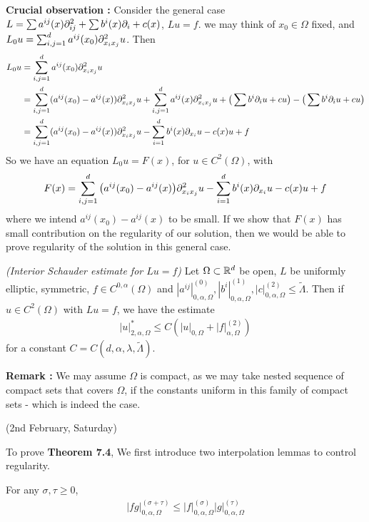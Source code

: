 \documentclass[12pt,a4paper]{article}
\begin{document}
\textbf{Crucial observation :} Consider the general case $L =\sum a^{ij}(x) \partial^2_{ij} + \sum b^i(x) \partial_i +c(x)$, $Lu =f$. we may think of $x_0\in \Omega$ fixed, and $L_0 u = \sum_{i,j=1}^d a^{ij}(x_0)  \partial_{x_i x_j}^2 u$. Then
\begin{align*}
L_0 u &= \sum_{i,j=1}^d a^{ij}(x_0) \partial_{x_i x_j}^2 u \\
&=\sum_{i,j=1}^d (a^{ij}(x_0) - a^{ij}(x))\partial^2_{x_i x_j} u + \sum_{i,j=1}^d a^{ij}(x) \partial^2_{x_i x_j} u + \big( \sum b^i\partial_i u + cu \big) - \big( \sum b^i\partial_i u + cu \big) \\
&= \sum_{i,j=1}^d (a^{ij}(x_0) - a^{ij}(x))\partial^2_{x_i x_j} u - \sum_{i=1}^d b^i(x) \partial_{x_i} u -c(x)u +f
\end{align*}
So we have an equation $L_0 u =F(x)$, for $u\in C^2(\Omega)$, with
\begin{align*}
F(x)= \sum_{i,j=1}^d \big( a^{ij}(x_0) - a^{ij}(x) \big) \partial^2_{x_i x_j}u  - \sum_{i=1}^d b^i(x) \partial_{x_i} u -c(x)u +f
\end{align*}
where we intend $a^{ij}(x_0) - a^{ij}(x)$ to be small. If we show that $F(x)$ has small contribution on the regularity of our solution, then we would be able to prove regularity of the solution in this general case.
\s

 \emph{(Interior Schauder estimate for $Lu=f$)} Let $\Omega \subset \mathbb{R}^d$ be open, $L$ be uniformly elliptic, symmetric, $f\in C^{0, \alpha}(\Omega)$ and $|a^{ij}|^{(0)}_{0, \alpha, \Omega}, |b^i|^{(1)}_{0, \alpha, \Omega}, |c|^{(2)}_{0, \alpha, \Omega} \leq \tilde{\Lambda}$. Then if $u\in C^2(\Omega)$ with $Lu =f$, we have the estimate
\begin{align*}
|u|^*_{2, \alpha, \Omega} \leq C(|u|_{0, \Omega} + |f|^{(2)}_{\alpha, \Omega})
\end{align*}
for a constant $C= C(d, \alpha, \lambda, \tilde{\Lambda})$.
\s

\textbf{Remark :} We may assume $\Omega$ is compact, as we may take nested sequence of compact sets that covers $\Omega$, if the constants uniform in this family of compact sets - which is indeed the case.
\s

\newday

(2nd February, Saturday)
\s

To prove \textbf{Theorem 7.4}, We first introduce two interpolation lemmas to control regularity.
\s

 For any $\sigma,\tau \geq 0$,
\begin{align*}
|fg|^{(\sigma +\tau)}_{0, \alpha, \Omega}\leq |f|^{(\sigma)}_{0, \alpha, \Omega} |g|^{(\tau)}_{0, \alpha, \Omega}
\end{align*}
\s
\end{document}
